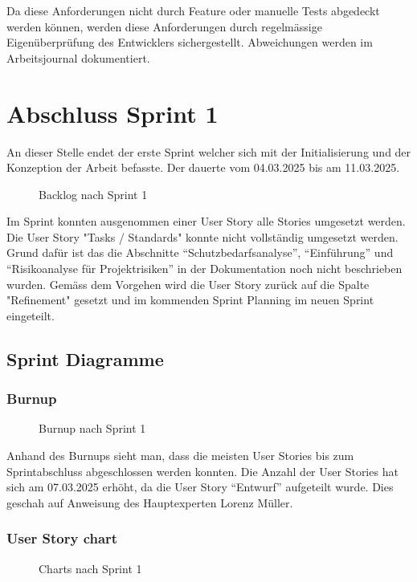 Da diese Anforderungen nicht durch Feature oder manuelle Tests abgedeckt werden können, werden diese Anforderungen
durch regelmässige Eigenüberprüfung des Entwicklers sichergestellt. Abweichungen werden im Arbeitsjournal dokumentiert. 


\chapter{Abschluss Sprint 1}
An dieser Stelle endet der erste Sprint welcher sich mit der Initialisierung und der Konzeption der
Arbeit befasste. Der dauerte vom 04.03.2025 bis am 11.03.2025.

\begin{figure}[h]
   \centering
   \caption{Backlog nach Sprint 1}
\end{figure}

Im Sprint konnten ausgenommen einer User Story alle Stories umgesetzt werden. 
Die User Story "Tasks / Standards" konnte nicht vollständig umgesetzt werden. 
Grund dafür ist das die Abschnitte ``Schutzbedarfsanalyse'', ``Einführung'' und ``Risikoanalyse für Projektrisiken'' in der Dokumentation noch nicht beschrieben wurden. 
Gemäss dem Vorgehen wird die User Story zurück auf die Spalte "Refinement" gesetzt und im kommenden Sprint Planning im neuen Sprint eingeteilt.

\newpage

\section{Sprint Diagramme}

\subsection{Burnup}

\begin{figure}[h]
   \centering
   \caption{Burnup nach Sprint 1}
\end{figure}

Anhand des Burnups sieht man, dass die meisten User Stories bis zum Sprintabschluss abgeschlossen werden konnten.
Die Anzahl der User Stories hat sich am 07.03.2025 erhöht, da die User Story ``Entwurf'' aufgeteilt wurde. Dies geschah auf Anweisung
des Hauptexperten Lorenz Müller.

\subsection{User Story chart}
\begin{figure}[h]
   \centering
   \caption{Charts nach Sprint 1}
\end{figure}


